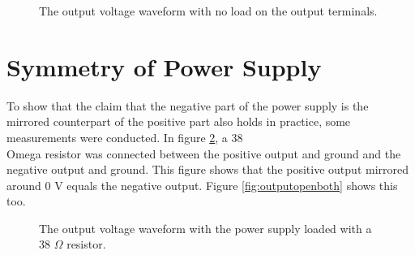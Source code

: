 \begin{figure}[H]
    \centering
    \captionsetup{justification=centering, labelfont=bf}
    \caption{The output voltage waveform with no load on the output terminals.}
    \label{fig:outputopen}
\end{figure}

\newpage

\section{Symmetry of Power Supply}
\label{sec:practevidencesymmetry}

To show that the claim that the negative part of the power supply is the mirrored counterpart of the positive part also holds in practice, some measurements were conducted. In figure \ref{fig:ripple38ohmboth}, a 38 \\Omega resistor was connected between the positive output and ground and the negative output and ground. This figure shows that the positive output mirrored around 0 V equals the negative output. Figure \ref{fig:outputopenboth} shows this too.

\begin{figure}[H]
    \centering
    \captionsetup{justification=centering, labelfont=bf}
    \caption{The output voltage waveform with the power supply loaded with a 38 \(\Omega\) resistor.}
    \label{fig:ripple38ohmboth}
\end{figure}

